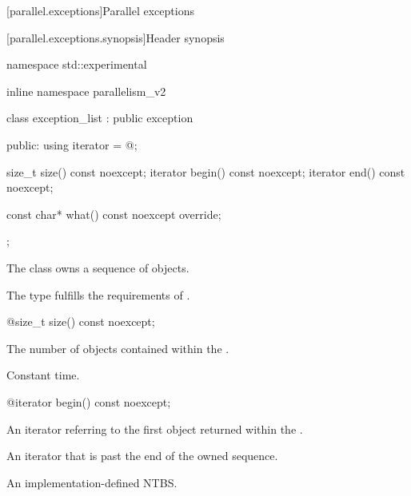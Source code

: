 
[parallel.exceptions]{Parallel exceptions}

[parallel.exceptions.synopsis]{Header  synopsis}

\begin{codeblock}
namespace std::experimental {
inline namespace parallelism_v2 {

  class exception_list : public exception {
  public:
    using iterator = @\unspec@;

    size_t size() const noexcept;
    iterator begin() const noexcept;
    iterator end() const noexcept;

    const char* what() const noexcept override;
  };
}
}
\end{codeblock}

\pnum The class  owns a sequence of  objects.

\pnum The type  fulfills the requirements of .

\begin{itemdecl}
@\pnum@ size_t size() const noexcept;
\end{itemdecl}

\begin{itemdescr}
  \pnum \returns The number of  objects contained within the .

  \pnum \complexity Constant time.
\end{itemdescr}

\begin{itemdecl}
@\pnum@ iterator begin() const noexcept;
\end{itemdecl}

\begin{itemdescr}
  \pnum \returns An iterator referring to the first  object returned within the .
\end{itemdescr}

\begin{itemdescr}
  \pnum \returns An iterator that is past the end of the owned sequence.
\end{itemdescr}

\begin{itemdescr}
  \pnum \returns An implementation-defined NTBS.
\end{itemdescr}

